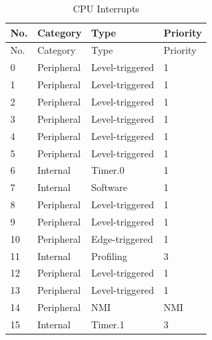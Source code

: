  \begin{longtable}[c]{ |p{1.5cm}|p{4.5cm}|p{4.5cm}|p{4cm}| } 

    \caption{CPU Interrupts}
    \label{tab:CPU-interrupt}\\
    \hline
    \rowcolor{lightgray}
   No. & Category     & Type              & Priority    \\
    \hline
    \endfirsthead
    
    \hline
    \rowcolor{lightgray}
   No. & Category     & Type              & Priority    \\
    \hline
    \endhead
    
    \endfoot
    
    \hline
    \endlastfoot
    
    0   & Peripheral    & Level-triggered   & 1                 \\
    \hline
    1   & Peripheral    & Level-triggered   & 1                 \\
    \hline
    2   & Peripheral    & Level-triggered   & 1                 \\
    \hline
    3   & Peripheral    & Level-triggered   & 1                 \\
    \hline
    4   & Peripheral    & Level-triggered   & 1                 \\
    \hline
    5   & Peripheral    & Level-triggered   & 1                 \\
    \hline
    6   & Internal      & Timer.0           & 1                 \\
    \hline
    7   & Internal      & Software          & 1                 \\
    \hline
    8   & Peripheral    & Level-triggered   & 1                 \\
    \hline
    9   & Peripheral    & Level-triggered   & 1                 \\
    \hline
    10  & Peripheral    & Edge-triggered    & 1                 \\
    \hline
    11  & Internal      & Profiling         & 3                 \\
    \hline
    12  & Peripheral    & Level-triggered   & 1                 \\
    \hline
    13  & Peripheral    & Level-triggered   & 1                 \\
    \hline
    14  & Peripheral    & NMI               & NMI               \\
    \hline
    15  & Internal      & Timer.1           & 3                 \\

\end{longtable}
